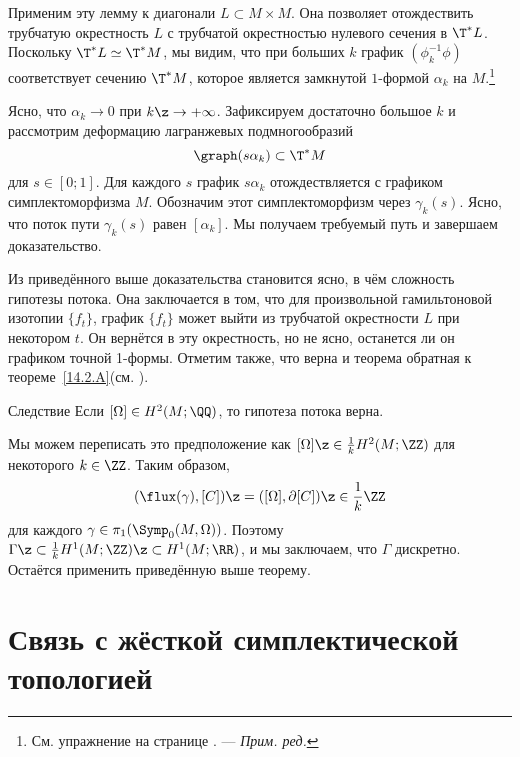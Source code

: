 Применим эту лемму к диагонали $L \subset M \times M$.
Она позволяет отождествить трубчатую окрестность $L$ с трубчатой
окрестностью нулевого сечения в $\T^\ast L$. 
Поскольку $\T^\ast L \simeq \T^\ast M$, мы видим, что при больших $k$
график $(\phi_k^{-1}\phi)$ соответствует сечению $\T^\ast M$, которое
является замкнутой $1$-формой $\alpha_k$ на
$M$.\footnote{См. упражнение на странице
  \pageref{1-form-lagrange}. — \textit{Прим. ред.}} 

Ясно, что $\alpha_k \to 0$ при $k\z\to +\infty$.
Зафиксируем достаточно большое $k$ и рассмотрим деформацию лагранжевых
подмногообразий  
\[\graph (s\alpha_k) \subset \T^\ast M\]
для $s \in [0;1]$.
Для каждого $s$ график $s\alpha_k$ отождествляется с графиком симплектоморфизма $M$.
Обозначим этот симплектоморфизм через $\gamma_k(s)$.
Ясно, что поток пути $\gamma_k(s)$ равен $[\alpha_k]$.
Мы получаем требуемый путь и завершаем доказательство.
\qeds

Из приведённого выше доказательства становится ясно, в чём
сложность гипотезы потока. 
Она заключается в том, что для произвольной гамильтоновой изотопии
$\{f_t\}$, график $\{f_t\}$ может выйти из трубчатой окрестности $L$
при некотором $t$. 
Он вернётся в эту окрестность, но не ясно, останется ли он графиком
точной 1-формы. 
Отметим также, что верна и теорема обратная к теореме~\ref{14.2.A}(см. \cite{LMP1}).

\begin{thm}{Следствие}
  Если $[\Omega] \in H^2(M;\QQ)$, то гипотеза потока верна.
\end{thm}

Мы можем переписать это предположение как $[\Omega] \z\in
\tfrac1kH^2(M;\ZZ)$ для некоторого $k\in\ZZ$.
Таким образом,
\[(\flux(\gamma), [C]) \z= ([\Omega], \partial[C]) \z\in \frac1k\ZZ\]
для каждого $\gamma \in \pi_1(\Symp_0(M,\Omega))$. 
Поэтому $\Gamma\z\subset \tfrac1k H^1(M;\ZZ)\z\subset H^1(M;\RR)$, и мы
заключаем, что $\Gamma$ дискретно. 
Остаётся применить приведённую выше теорему.
\qeds

\section{Связь с жёсткой симплектической топологией}

